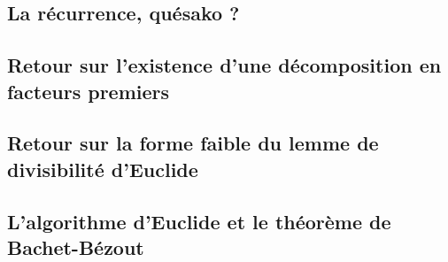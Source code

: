 \subsection{La récurrence, quésako ?}




\subsection{Retour sur l'existence d'une décomposition en facteurs premiers}\label{exists-decompo-clean}




\subsection{Retour sur la forme faible du lemme de divisibilité d'Euclide}




\subsection{L'algorithme d'Euclide et le théorème de Bachet-Bézout}

